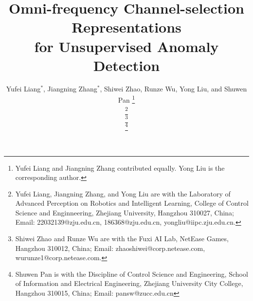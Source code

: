 \documentclass[lettersize,journal]{IEEEtran}
\begin{document}
\title{Omni-frequency Channel-selection Representations \\for Unsupervised Anomaly Detection}

\author{Yufei Liang$^*$, Jiangning Zhang$^*$, Shiwei Zhao, Runze Wu, Yong Liu, and Shuwen Pan
\thanks{Yufei Liang and Jiangning Zhang contributed equally. Yong Liu is the corresponding author.}

\thanks{Yufei Liang, Jiangning Zhang, and Yong Liu are with the Laboratory of Advanced Perception on Robotics and Intelligent Learning, College of Control Science and Enginneering, Zhejiang University, Hangzhou 310027, China; Email: 22032139@zju.edu.cn, 186368@zju.edu.cn, yongliu@iipc.zju.edu.cn.}

\thanks{Shiwei Zhao and Runze Wu are with the Fuxi AI Lab, NetEase Games, Hangzhou 310012, China; Email: zhaoshiwei@corp.netease.com, wurunze1@corp.netease.com.}

\thanks{Shuwen Pan is with the Discipline of Control Science and Engineering, School of Information and Electrical Engineering, Zhejiang University City College, Hangzhou 310015, China; Email: pansw@zucc.edu.cn}

}



\maketitle
\end{document}
